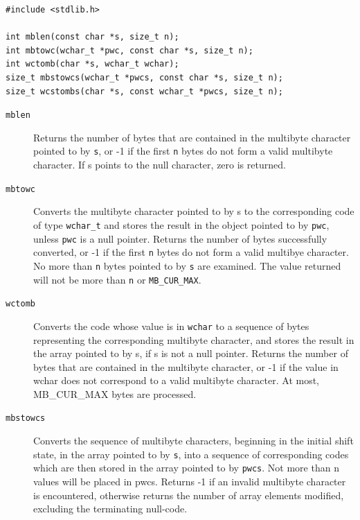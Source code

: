    \begin{Verbatim}
#include <stdlib.h>

int mblen(const char *s, size_t n);
int mbtowc(wchar_t *pwc, const char *s, size_t n);
int wctomb(char *s, wchar_t wchar);
size_t mbstowcs(wchar_t *pwcs, const char *s, size_t n);
size_t wcstombs(char *s, const wchar_t *pwcs, size_t n);
\end{Verbatim}

   \begin{description}
    \item[\texttt{mblen}] Returns the number of bytes that  are  contained  in  the multibyte
     character pointed to by \texttt{s}, or -1 if the first
     \texttt{n} bytes do not form a  valid  multibyte  character.   If
     s points to the null character, zero is returned.

    \item[\texttt{mbtowc}] Converts the multibyte character pointed to by s  to  the corresponding
     code of type \texttt{wchar\_t} and stores the result in the object
     pointed to by \texttt{pwc}, unless  \texttt{pwc}  is  a  null
     pointer.    Returns  the  number  of  bytes  successfully converted, or
     -1 if the first \texttt{n} bytes do not form a valid
     multibye character.  No more than \texttt{n} bytes pointed to by
     \texttt{s} are examined.  The value returned will not be more than
     \texttt{n} or \texttt{MB\_CUR\_MAX}.

    \item[\texttt{wctomb}] Converts the code whose value is in
     \texttt{wchar} to  a  sequence of   bytes   representing   the
     corresponding  multibyte character, and stores the result in the array
     pointed  to by  s, if s is not a null pointer.  Returns the number of
     bytes that are contained in the multibyte character, or -1 if the
     value in wchar does not correspond to a valid multibyte  character.  At
     most, MB\_CUR\_MAX  bytes  are processed.

    \item[\texttt{mbstowcs}] 
     Converts the sequence of multibyte characters,  beginning in the
      initial shift state, in the array pointed to by \texttt{s}, into
      a sequence of corresponding  codes  which  are  then stored  in  the
      array pointed to by \texttt{pwcs}. Not more than n values will be
      placed in pwcs.  Returns -1 if an  invalid multibyte
      character is encountered, otherwise returns the number  of  array
      elements   modified,   excluding   the terminating null-code.



\end{description}

